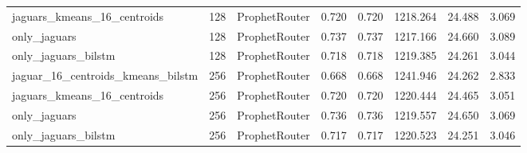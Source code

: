 \begin{table}
\begin{tabular}{lllrrrrr}
\cline{1-8} \cline{2-8} \cline{3-8}
jaguars_kmeans_16_centroids & 128 & ProphetRouter & 0.720 & 0.720 & 1218.264 & 24.488 & 3.069 \\
\cline{1-8} \cline{2-8} \cline{3-8}
only_jaguars & 128 & ProphetRouter & 0.737 & 0.737 & 1217.166 & 24.660 & 3.089 \\
\cline{1-8} \cline{2-8} \cline{3-8}
only_jaguars_bilstm & 128 & ProphetRouter & 0.718 & 0.718 & 1219.385 & 24.261 & 3.044 \\
\cline{1-8} \cline{2-8} \cline{3-8}
jaguar_16_centroids_kmeans_bilstm & 256 & ProphetRouter & 0.668 & 0.668 & 1241.946 & 24.262 & 2.833 \\
\cline{1-8} \cline{2-8} \cline{3-8}
jaguars_kmeans_16_centroids & 256 & ProphetRouter & 0.720 & 0.720 & 1220.444 & 24.465 & 3.051 \\
\cline{1-8} \cline{2-8} \cline{3-8}
only_jaguars & 256 & ProphetRouter & 0.736 & 0.736 & 1219.557 & 24.650 & 3.069 \\
\cline{1-8} \cline{2-8} \cline{3-8}
only_jaguars_bilstm & 256 & ProphetRouter & 0.717 & 0.717 & 1220.523 & 24.251 & 3.046 \\
\cline{1-8} \cline{2-8} \cline{3-8}
\bottomrule
\end{tabular}
\end{table}
